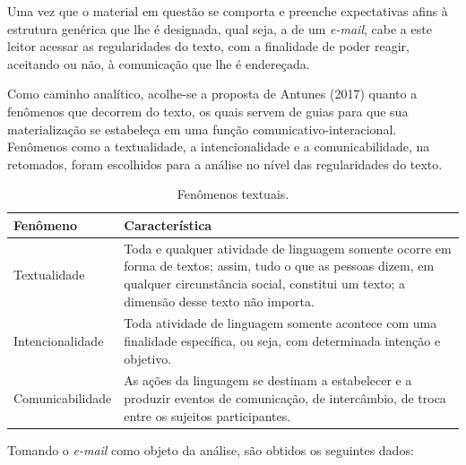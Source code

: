 \documentclass[portuguese]{textolivre}
\begin{document}
Uma vez que o material em questão se comporta e preenche expectativas afins à estrutura genérica que lhe é designada, qual seja, a de um \textit{e-mail}, cabe a este leitor acessar as regularidades do texto, com a finalidade de poder reagir, aceitando ou não, à comunicação que lhe é endereçada.

Como caminho analítico, acolhe-se a proposta de Antunes (2017) quanto a fenômenos que decorrem do texto, os quais servem de guias para que sua materialização se estabeleça em uma função comunicativo-interacional. Fenômenos como a textualidade, a intencionalidade e a comunicabilidade, na  retomados, foram escolhidos para a análise no nível das regularidades do texto.

\begin{table}[htbp]
\centering
\begin{threeparttable}
\caption{Fenômenos textuais.}
\label{tab1}

\begin{tabularx}{\textwidth}{>{\raggedright\arraybackslash}p{}X}
\toprule
\textbf{Fenômeno} & \textbf{Característica} \\
\midrule
Textualidade &
Toda e qualquer atividade de linguagem somente ocorre em forma de textos; assim, tudo o que as pessoas dizem, em qualquer circunstância social, constitui um texto; a dimensão desse texto não importa. \\
\addlinespace

Intencionalidade &
Toda atividade de linguagem somente acontece com uma finalidade específica, ou seja, com determinada intenção e objetivo. \\
\addlinespace

Comunicabilidade &
As ações da linguagem se destinam a estabelecer e a produzir eventos de comunicação, de intercâmbio, de troca entre os sujeitos participantes. \\
\bottomrule
\end{tabularx}
\end{threeparttable}
\end{table}

Tomando o \textit{e-mail} como objeto da análise, são obtidos os seguintes dados:
\end{document}
